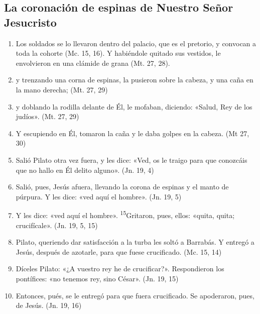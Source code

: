 \documentclass[a4paper,11pt]{article}
\begin{document}
    \subsection*{\hfil La coronación de espinas de Nuestro Señor Jesucristo \hfil}
      
      \begin{enumerate}

        \item Los soldados se lo llevaron dentro del palacio, que es el pretorio, y convocan a toda la cohorte (Mc. 15, 16).
        Y habiéndole quitado sus vestidos, le envolvieron en una clámide de grana (Mt. 27, 28).

        \item y trenzando una corna de espinas, la pusieron sobre la cabeza, y una caña en la mano derecha; (Mt. 27, 29)

        \item y doblando la rodilla delante de Él, le mofaban, diciendo: «Salud, Rey de los judíos». (Mt. 27, 29)

        \item Y escupiendo en Él, tomaron la caña y le daba golpes en la cabeza. (Mt 27, 30)

        \item Salió Pilato otra vez fuera, y les dice: «Ved, os le traigo para que conozcáis que no hallo en Él delito alguno». (Jn. 19, 4)

        \item Salió, pues, Jesús afuera, llevando la corona de espinas y el manto de púrpura. Y les dice: «ved aquí el hombre». (Jn. 19, 5)

        \item Y les dice: «ved aquí el hombre». \textsuperscript{15}Gritaron, pues, ellos: «quita, quita; crucifícale». (Jn. 19, 5, 15)

        \item Pilato, queriendo dar satisfacción a la turba les soltó a Barrabás. Y entregó a Jesús, después de azotarle, para que fuese crucificado. (Mc. 15, 14)

        \item Díceles Pilato: «¿A vuestro rey he de crucificar?». Respondieron los pontífices: «no tenemos rey, sino César». (Jn. 19, 15)

        \item Entonces, pués, se le entregó para que fuera crucificado. Se apoderaron, pues, de Jesús. (Jn. 19, 16)

      \end{enumerate}
\end{document}
